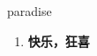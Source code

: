 
\begin{frame}
{\huge paradise}
\begin{center}
\begin{enumerate}\Large
  \item \textbf{快乐，狂喜}
\end{enumerate}
\end{center}
\end{frame}
